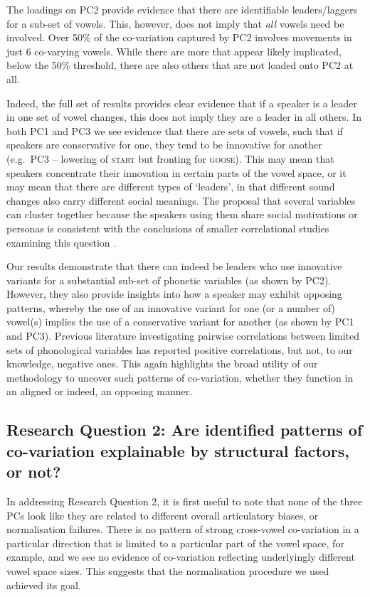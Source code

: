 \documentclass[review]{elsarticle} %
\begin{document}
The loadings on PC2 provide evidence that there are identifiable leaders/laggers for a sub-set of vowels.  This, however, does not imply that \textit{all} vowels need be involved. Over 50\% of the co-variation captured by PC2 involves movements in just 6 co-varying vowels.  While there are more that appear likely implicated, below the 50\% threshold, there are also others that are not loaded onto PC2 at all. 

Indeed, the full set of results provides clear evidence that if a speaker is a leader in one set of vowel changes, this does not imply they are a leader in all others.  In both PC1 and PC3 we see evidence that there are sets of vowels, such that if speakers are conservative for one, they tend to be innovative for another (e.g.\ PC3 -- lowering of \textsc{start} but fronting for \textsc{goose}).  This may mean that speakers concentrate their innovation in certain parts of the vowel space, or it may mean that there are different types of `leaders', in that different sound changes also carry different social meanings.  The proposal that several variables can cluster together because the speakers using them share social motivations or personas is consistent with the conclusions of smaller correlational studies examining this question \citep{becker2016linking, tamminga2019interspeaker}.

Our results demonstrate that there can indeed be leaders who use innovative variants for a substantial sub-set of phonetic variables (as shown by PC2). However, they also provide insights into how a speaker may exhibit opposing patterns, whereby the use of an innovative variant for one (or a number of) vowel(s) implies the use of a conservative variant for another (as shown by PC1 and PC3).  Previous literature investigating pairwise correlations between limited sets of phonological variables has reported positive correlations, but not, to our knowledge, negative ones. This again highlights the broad utility of our methodology to uncover such patterns of co-variation, whether they function in an aligned or indeed, an opposing manner.

\subsection{Research Question 2:  Are identified patterns of co-variation explainable by structural factors, or not?}


In addressing Research Question 2, it is first useful to note that none of the three PCs look like they are related to different overall articulatory biases, or normalisation failures. There is no pattern of strong cross-vowel co-variation in a particular direction that is limited to a particular part of the vowel space, for example, and we see no evidence of co-variation reflecting underlyingly different vowel space sizes. This suggests that the normalisation procedure we used achieved its goal.
\end{document}
